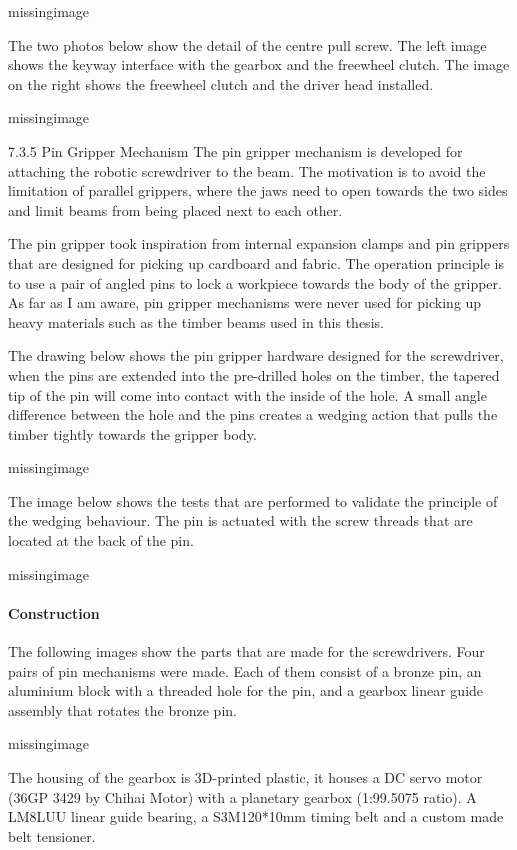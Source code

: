 missingimage

The two photos below show the detail of the centre pull screw. The left image shows the keyway interface with the gearbox and the freewheel clutch. The image on the right shows the freewheel clutch and the driver head installed.

missingimage

7.3.5 Pin Gripper Mechanism
The pin gripper mechanism is developed for attaching the robotic screwdriver to the beam. The motivation is to avoid the limitation of parallel grippers, where the jaws need to open towards the two sides and limit beams from being placed next to each other. 

The pin gripper took inspiration from internal expansion clamps and pin grippers that are designed for picking up cardboard and fabric. The operation principle is to use a pair of angled pins to lock a workpiece towards the body of the gripper. As far as I am aware, pin gripper mechanisms were never used for picking up heavy materials such as the timber beams used in this thesis.

The drawing below shows the pin gripper hardware designed for the screwdriver, when the pins are extended into the pre-drilled holes on the timber, the tapered tip of the pin will come into contact with the inside of the hole. A small angle difference between the hole and the pins creates a wedging action that pulls the timber tightly towards the gripper body.  

missingimage

The image below shows the tests that are performed to validate the principle of the wedging behaviour. The pin is actuated with the screw threads that are located at the back of the pin. 

missingimage

\paragraph{Construction}
The following images show the parts that are made for the screwdrivers. Four pairs of pin mechanisms were made. Each of them consist of a bronze pin, an aluminium block with a threaded hole for the pin, and a gearbox linear guide assembly that rotates the bronze pin.

missingimage

The housing of the gearbox is 3D-printed plastic, it houses a DC servo motor (36GP 3429 by Chihai Motor) with a planetary gearbox (1:99.5075 ratio). A LM8LUU linear guide bearing, a S3M120*10mm timing belt and a custom made belt tensioner.

